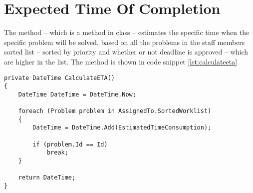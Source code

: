 \section{Expected Time Of Completion}
\label{sec:expected_time_of_completion}

The  method -- which is a method in  class -- estimates the specific time when the specific problem will be solved, based on all the problems in the staff members sorted list -- sorted by priority and whether or not deadline is approved -- which are higher in the list. The method is shown in code snippet \ref{lst:calculateeta}

\begin{lstlisting}[style=sourceCode, caption=\myCaption{The ManageTagTimes method}, label=lst:calculateeta]
private DateTime CalculateETA()
{
    DateTime DateTime = DateTime.Now;

    foreach (Problem problem in AssignedTo.SortedWorklist)
    {
        DateTime = DateTime.Add(EstimatedTimeConsumption);

        if (problem.Id == Id)
            break;
    }

    return DateTime;
}
\end{lstlisting}